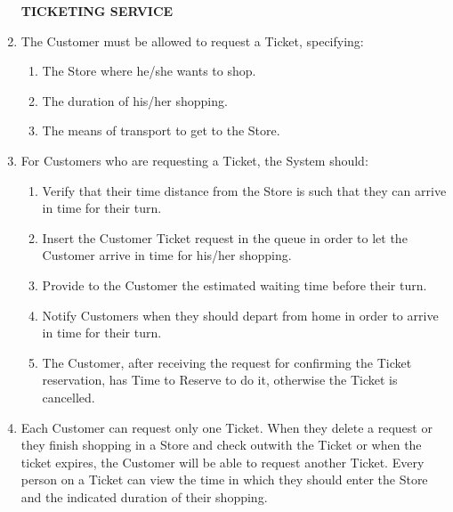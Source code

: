 \documentclass[a4paper, 12pt, oneside]{article}
\begin{document}
\begin{enumerate}[align=left, label={R.\arabic{*}}]
    \item[\textbf{TICKETING SERVICE}]
    \item \label{req:requestTicket} The Customer must be allowed to request a Ticket, specifying:
     \begin{enumerate}[label={-}]
        \item \label{req:requestTicket:store} The Store where he/she wants to shop.
        \item \label{req:requestTicket:duration}The duration of his/her shopping.
        \item \label{req:requestTicket:transport}The means of transport to get to the Store.
    \end{enumerate}
    \item \label{req:systemTicket}For Customers who are requesting a Ticket, the System should:
    \begin{enumerate}[label={-}]
        \item \label{req:systemTicket:verifyDist} Verify that their time distance from the Store is such that they can arrive in time for their turn.
        \item \label{req:systemTicket:addInQueue}Insert the Customer Ticket request in the queue in order to let the Customer arrive in time for his/her shopping.
        \item \label{req:systemTicket:waitingTime} Provide to the Customer the estimated waiting time before their turn.
        \item \label{req:systemTicket:notifForDepart} Notify Customers when they should depart from home in order to arrive in time for their turn.
        \item \label{req:systemTicket:reserveTimeout}The Customer, after receiving the request for confirming the Ticket reservation, has Time to Reserve to do it, otherwise the Ticket is cancelled.
    \end{enumerate}
    \item \label{req:numberTicketPerCust} Each Customer can request only one Ticket. When they delete a request or they finish shopping in a Store and check outwith the Ticket or when the ticket expires, the Customer will be able to request another Ticket.
    \label{req:codeUnique:ticketInfo}Every person on a Ticket can view the time in which they should enter the Store and the indicated duration of their shopping.
    

\end{enumerate}
\end{document}
